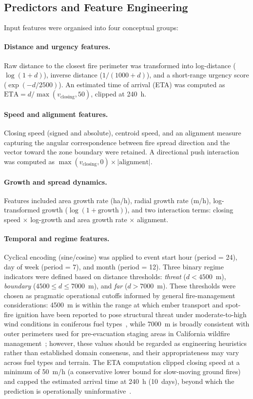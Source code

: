 \documentclass[fire,article,submit,pdftex]{../Definitions/mdpi}
\begin{document}
\subsection{Predictors and Feature Engineering}\label{sec:features}

Input features were organised into four conceptual groups:

\paragraph{Distance and urgency features.}
Raw distance to the closest fire perimeter was transformed into log-distance ($\log(1 + d)$), inverse distance ($1 / (1000 + d)$), and a short-range urgency score ($\exp(-d / 2500)$).
An estimated time of arrival (ETA) was computed as $\text{ETA} = d / \max(v_{\mathrm{closing}}, 50)$, clipped at 240~h.

\paragraph{Speed and alignment features.}
Closing speed (signed and absolute), centroid speed, and an alignment measure capturing the angular correspondence between fire spread direction and the vector toward the zone boundary were retained.
A directional push interaction was computed as $\max(v_{\mathrm{closing}}, 0) \times |\text{alignment}|$.

\paragraph{Growth and spread dynamics.}
Features included area growth rate (ha/h), radial growth rate (m/h), log-transformed growth ($\log(1 + \text{growth})$), and two interaction terms: closing speed $\times$ log-growth and area growth rate $\times$ alignment.

\paragraph{Temporal and regime features.}
Cyclical encoding (sine/cosine) was applied to event start hour (period = 24), day of week (period = 7), and month (period = 12).
Three binary regime indicators were defined based on distance thresholds: \emph{threat} ($d < 4500$~m), \emph{boundary} ($4500 \leq d \leq 7000$~m), and \emph{far} ($d > 7000$~m).
These thresholds were chosen as pragmatic operational cutoffs informed by general fire-management considerations: 4500~m is within the range at which ember transport and spot-fire ignition have been reported to pose structural threat under moderate-to-high wind conditions in coniferous fuel types~\cite{Cruz2003,Finney2001}, while 7000~m is broadly consistent with outer perimeters used for pre-evacuation staging areas in California wildfire management~\cite{Dolan2022}; however, these values should be regarded as engineering heuristics rather than established domain consensus, and their appropriateness may vary across fuel types and terrain.
The ETA computation clipped closing speed at a minimum of 50~m/h (a conservative lower bound for slow-moving ground fires) and capped the estimated arrival time at 240~h (10~days), beyond which the prediction is operationally uninformative~\cite{Taylor2013}.
\end{document}
